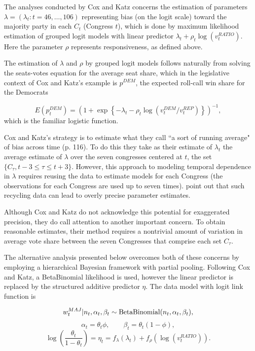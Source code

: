 The analyses conducted by Cox and Katz concerns the estimation of parameters  $\lambda = (\lambda_t : t = 46, \dots, 106)$ representing bias (on the logit scale) toward the majority party in each $C_t$ (Congress $t$), which is done by maximum likelihood estimation of grouped logit models with linear predictor $ \lambda_t + \rho_t \log{\left(v_t^{RATIO} \right)}$. Here the parameter $\rho$ represents responsiveness, as defined above. 

The estimation of $\lambda$ and $\rho$ by grouped logit models follows naturally from solving the seats-votes equation for the average seat share, which in the legislative context of Cox and Katz's example is $p^{DEM}$, the expected roll-call win share for the Democrats 

{\singlespacing
$$  
  E(p^{DEM}_t)  = \left(1 + \exp{\left\{- \lambda_t - \rho_t \log{\left( v_t^{DEM}/v_t^{REP}  \right)}\right\}}\right)^{-1},
$$
}
%
\noindent which is the familiar logistic function. 

Cox and Katz's strategy is to estimate what they call ``a sort of running average" of bias across time (p. 116). To do this they take as their estimate of $\lambda_t$ the average estimate of $\lambda$ over the seven congresses centered at $t$, the set $\{C_\tau, t-3 \leq \tau \leq t+3\}$. However, this approach to modeling temporal dependence in $\lambda$ requires reusing the data to estimate models for each Congress (the observations for each Congress are used up to seven times).   point out that such recycling data can lead to overly precise parameter estimates. 

Although Cox and Katz do not acknowledge this potential for exaggerated precision, they do call attention to another important concern. To obtain reasonable estimates, their method requires a nontrivial amount of variation in average vote share between the seven Congresses that comprise each set $C_\tau$. 

The alternative analysis presented below overcomes both of these concerns by employing a hierarchical Bayesian framework with partial pooling. Following Cox and Katz, a BetaBinomial likelihood is used, however the linear predictor is replaced by the structured additive predictor $\eta$. The data model with logit link function is 

$$w_t^{MAJ} | n_t, \alpha_t, \beta_t \sim {\rm BetaBinomial}(n_t, \alpha_t, \beta_t),$$
$$ \alpha_t = \theta_t \phi, \qquad \beta_t = \theta_t (1 - \phi),$$
$$ \log\left({\frac{\theta_t}{1 - \theta_t}}\right) = \eta_t = f_{\lambda}(\lambda_t) + f_\rho \left(\log{(v_t^{RATIO})}\right).$$


